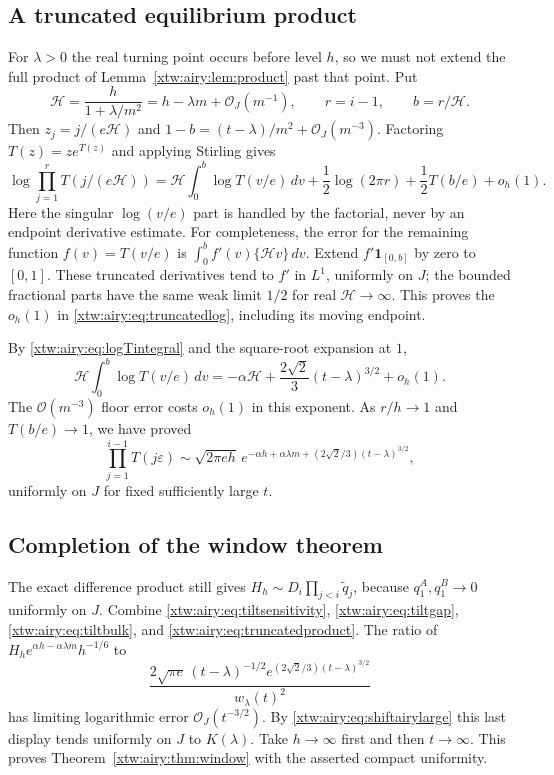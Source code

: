 \documentclass[11pt]{article}
\theoremstyle{remark}\newtheorem{remark}[theorem]{Remark}
\newcommand{\OO}{\mathcal O}
\begin{document}
\subsection{A truncated equilibrium product}
For $\lambda>0$ the real turning point occurs before level $h$, so we must
not extend the full product of Lemma~\ref{xtw:airy:lem:product} past that point.
Put
\begin{equation}\label{xtw:airy:eq:Hreal}
 \mathcal H=\frac h{1+\lambda/m^2}=h-\lambda m+\OO_J(m^{-1}),
 \qquad r=i-1,\qquad b=r/\mathcal H.
\end{equation}
Then $z_j=j/(e\mathcal H)$ and
$1-b=(t-\lambda)/m^2+\OO_J(m^{-3})$.
Factoring $T(z)=ze^{T(z)}$ and applying Stirling gives
\begin{equation}\label{xtw:airy:eq:truncatedlog}
 \log\prod_{j=1}^{r}T(j/(e\mathcal H))
 =\mathcal H\int_0^b\log T(v/e)\,dv
     +\frac12\log(2\pi r)+\frac12T(b/e)+o_h(1).
\end{equation}
Here the singular $\log(v/e)$ part is handled by the factorial, never by an
endpoint derivative estimate. For completeness, the error for the remaining
function $f(v)=T(v/e)$ is
$\int_0^b f'(v)\{\mathcal H v\}\,dv$. Extend $f'\mathbf1_{[0,b]}$ by zero
to $[0,1]$. These truncated derivatives tend to $f'$ in $L^1$, uniformly
on $J$; the bounded fractional parts have the same weak limit $1/2$ for
real $\mathcal H\to\infty$. This proves the $o_h(1)$ in
\eqref{xtw:airy:eq:truncatedlog}, including its moving endpoint.

By \eqref{xtw:airy:eq:logTintegral} and the square-root expansion at $1$,
\[
 \mathcal H\int_0^b\log T(v/e)\,dv
 =-\alpha\mathcal H+\frac{2\sqrt2}{3}(t-\lambda)^{3/2}+o_h(1).
\]
The $\OO(m^{-3})$ floor error costs $o_h(1)$ in this exponent.
As $r/h\to1$ and $T(b/e)\to1$, we have proved
\begin{equation}\label{xtw:airy:eq:truncatedproduct}
 \prod_{j=1}^{i-1}T(j\varepsilon)
 \sim\sqrt{2\pi e h}\,
 e^{-\alpha h+\alpha\lambda m+(2\sqrt2/3)(t-\lambda)^{3/2}},
\end{equation}
uniformly on $J$ for fixed sufficiently large $t$.

\subsection{Completion of the window theorem}
The exact difference product still gives
$H_h\sim D_i\prod_{j<i}\widetilde q_j$, because $q_1^A,q_1^B\to0$
uniformly on $J$. Combine \eqref{xtw:airy:eq:tiltsensitivity}, \eqref{xtw:airy:eq:tiltgap},
\eqref{xtw:airy:eq:tiltbulk}, and \eqref{xtw:airy:eq:truncatedproduct}. The ratio of
$H_h e^{\alpha h-\alpha\lambda m}h^{-1/6}$ to
\[
 \frac{2\sqrt{\pi e}\,(t-\lambda)^{-1/2}
 e^{(2\sqrt2/3)(t-\lambda)^{3/2}}}{w_\lambda(t)^2}
\]
has limiting logarithmic error $\OO_J(t^{-3/2})$. By
\eqref{xtw:airy:eq:shiftairylarge} this last display tends uniformly on $J$ to
$K(\lambda)$. Take $h\to\infty$ first and then $t\to\infty$.
This proves Theorem~\ref{xtw:airy:thm:window} with the asserted compact uniformity.
\end{document}
